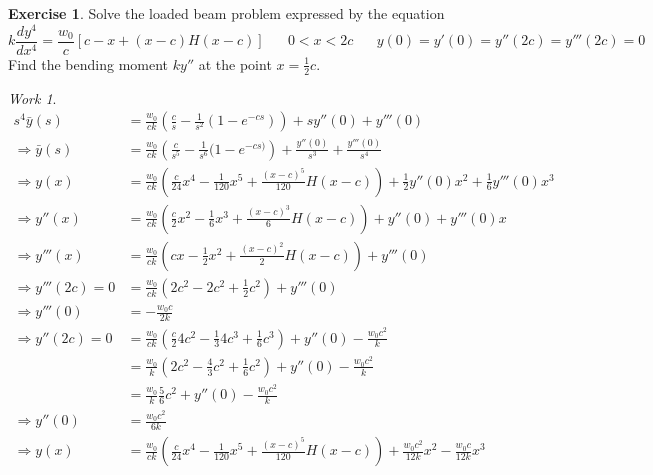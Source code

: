 \documentclass{report}
\theoremstyle{definition}
\newtheorem{exercise}{Exercise}[chapter]
\theoremstyle{remark}
\newtheorem*{work}{Work}
\newcommand{\twen}{\hspace{20pt}}
\newcommand{\od}[2]{\frac{d #1}{d#2}}
\begin{document}
\begin{exercise}
    Solve the loaded beam problem expressed by the equation 
    \begin{equation*}
        k\od{y^4}{x^4} = \frac{w_0}{c}[c-x+(x-c)H(x-c)] \twen 0<x<2c \twen y(0)=y'(0)=y''(2c)=y'''(2c)=0
    \end{equation*}
    Find the bending moment $ky''$ at the point $x=\frac{1}{2}c$.
\end{exercise}
\begin{work}
    \begin{equation*}
        \begin{split}
            s^4\bar y(s) &= \frac{w_0}{ck}\left(\frac{c}{s} - \frac{1}{s^2}(1-e^{-cs})\right)+sy''(0)+y'''(0) \\
            \Rightarrow \bar y(s) &=\frac{w_0}{ck}\left( \frac{c}{s^5}-\frac{1}{s^6}(1-e^{-cs)}\right)+\frac{y''(0)}{s^3}+\frac{y'''(0)}{s^4}\\
            \Rightarrow y(x)&=\frac{w_0}{ck}\left( \frac{c}{24}x^4-\frac{1}{120}x^5+\frac{(x-c)^5}{120}H(x-c)\right) + \frac{1}{2}y''(0)x^2+\frac{1}{6}y'''(0)x^3\\
            \Rightarrow y''(x)&=\frac{w_0}{ck}\left( \frac{c}{2}x^2-\frac{1}{6}x^3+\frac{(x-c)^3}{6}H(x-c)\right)+y''(0)+y'''(0)x\\
            \Rightarrow y'''(x)&=\frac{w_0}{ck}\left( cx -\frac{1}{2}x^2+\frac{(x-c)^2}{2}H(x-c)\right)+y'''(0)\\
            \Rightarrow y'''(2c)=0&=\frac{w_0}{ck}\left(2c^2-2c^2+\frac{1}{2}c^2\right) +y'''(0)\\
            \Rightarrow y'''(0) &=-\frac{w_0c}{2k} \\
            \Rightarrow y''(2c)=0&=\frac{w_0}{ck}\left(\frac{c}{2}4c^2-\frac{1}{3}4c^3+\frac{1}{6}c^3 \right) +y''(0) - \frac{w_0c^2}{k}\\
            &= \frac{w_0}{k}\left( 2c^2-\frac{4}{3}c^2+\frac{1}{6}c^2 \right)+y''(0) -\frac{w_0c^2}{k}\\
            &=\frac{w_0}{k}\frac{5}{6}c^2+y''(0)-\frac{w_0c^2}{k} \\
            \Rightarrow y''(0) &=\frac{w_0c^2}{6k}\\
            \Rightarrow y(x) &=\frac{w_0}{ck}\left( \frac{c}{24}x^4-\frac{1}{120}x^5+\frac{(x-c)^5}{120}H(x-c)\right) + \frac{w_0c^2}{12k}x^2-\frac{w_0c}{12k}x^3
        \end{split}
    \end{equation*}
\end{work}
\end{document}
